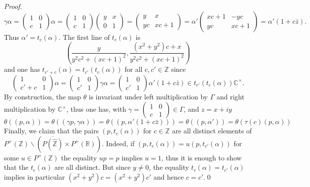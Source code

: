 \documentclass[graybox, envcountsect%
]{svmult}
\def\C{{\mathbb C}}
\def\R{{\mathbb R}}
\def\Z{{\mathbb Z}}
\begin{document}
\begin{proof}
 $$
 \gamma\alpha=\begin{pmatrix} 1 &0 \\
c &1 \end{pmatrix}\alpha = \begin{pmatrix} 1 &0 \\
c &1 \end{pmatrix}\begin{pmatrix} y &x \\
0 &1 \end{pmatrix}=\begin{pmatrix} y &x \\
yc & xc+1 \end{pmatrix}=\alpha'\begin{pmatrix} xc+1 & -yc \\
yc & xc+1 \end{pmatrix}=\alpha' (1+c \bar z).
 $$
Thus $\alpha'=t_c(\alpha)$. The first line of $t_c(\alpha)$ is 
$$
\left(\frac{y}{y^2 c^2+(x c+1)^2},\frac{(x^2 +y^2) c+x}{y^2 c^2+(x c+1)^2}\right)
$$
and one has $t_{c'+c}(\alpha)=t_{c'}(t_c(\alpha))$ for all $c,c'\in \Z$ since
$$
\begin{pmatrix} 1 &0 \\
c'+c &1 \end{pmatrix}\alpha= \begin{pmatrix} 1 &0 \\
c' &1 \end{pmatrix}\gamma\alpha=\begin{pmatrix} 1 &0 \\
c' &1 \end{pmatrix}\alpha'(1+c \bar z)\in t_{c'}(t_c(\alpha))\C^\times.
$$
  By construction, the map $\theta$ is invariant under left multiplication by $\Gamma$ and right multiplication by $\C^\times$, thus one has, with $\gamma=\begin{pmatrix} 1 &0 \\
c &1 \end{pmatrix}\in \Gamma$, and $z=x+iy$ 
$$
\theta((p,\alpha))=
\theta((\gamma p,\gamma\alpha))=\theta((p,\alpha' (1+c\bar z)))=
\theta((p,\alpha'))=\theta(\tau(c)(p,\alpha))
$$
Finally, we claim that the pairs $(p,t_c(\alpha))$ for $c\in \Z$ are all distinct elements of $P^+(\Z)\backslash (\overline{P(\hat \Z)}\times P^+(\R))$. Indeed, if $(p,t_c(\alpha))=u(p,t_{c'}(\alpha))$ for some $u\in P^+(\Z)$ the equality $up=p$ implies $u=1$, thus it is enough to show that the $t_c(\alpha)$ are all distinct.  But since $y\neq 0$, the equality $t_c(\alpha)=t_{c'}(\alpha)$ implies in particular $(x^2 +y^2) c=(x^2 +y^2) c'$ and hence $c=c'$.\qed   \end{proof} 
\end{document}
